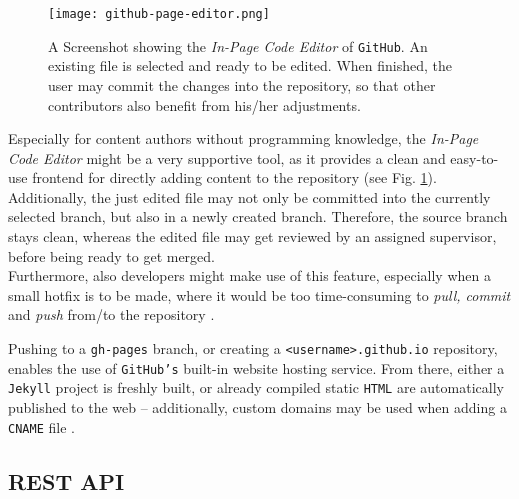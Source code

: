 \begin{figure} %
    \centering
    \texttt{[image: github-page-editor.png]}
    \caption{A Screenshot showing the \emph{In-Page Code Editor} of \texttt{GitHub}. An existing file is selected and ready to be edited. When finished, the user may commit the changes into the repository, so that other contributors also benefit from his/her adjustments.}
    \label{fig:github-page-editor}
\end{figure}
%

Especially for content authors without programming knowledge, the \emph{In-Page Code Editor} might be a very supportive tool, as it provides a clean and easy-to-use frontend for directly adding content to the repository (see Fig. \ref{fig:github-page-editor}). Additionally, the just edited file may not only be committed into the currently selected branch, but also in a newly created branch. Therefore, the source branch stays clean, whereas the edited file may get reviewed by an assigned supervisor, before being ready to get merged.\\
Furthermore, also developers might make use of this feature, especially when a small hotfix is to be made, where it would be too time-consuming to \emph{pull, commit} and \emph{push} from/to the repository \cite[405]{loeliger2012version}.

Pushing to a \texttt{gh-pages} branch, or creating a \texttt{<username>.github.io} repository, enables the use of \texttt{GitHub's} built-in website hosting service. From there, either a \texttt{Jekyll} project is freshly built, or already compiled static \texttt{HTML} are automatically published to the web -- additionally, custom domains may be used when adding a \texttt{CNAME} file \cite[p. 171f]{dhillon2016}.

\subsection{REST API}
